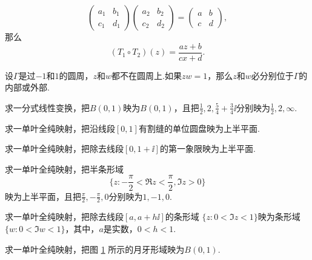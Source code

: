 \begin{xiti}
    \[\begin{pmatrix}
      a_1&b_1\\c_1&d_1
    \end{pmatrix}\begin{pmatrix}
    a_2&b_2\\c_2&d_2
    \end{pmatrix}=\begin{pmatrix}
    a&b\\c&d
    \end{pmatrix},\]
那么
\[(T_1\circ T_2)(z)=\frac{az+b}{cx+d}.\]
\item 设$\Gamma$是过$-1$和$1$的圆周，$z$和$w$都不在圆周上.如果$zw=1$，那么$z$和$w$必分别位于$\Gamma$的内部或外部.
\item 求一分式线性变换，把$B(0,1)$映为$B(0,1)$，且把$\frac12,2,\frac54+\frac34\ii$分别映为$\frac12,2,\infty$.
\item 求一单叶全纯映射，把沿线段$[0,1]$有割缝的单位圆盘映为上半平面.
\item 求一单叶全纯映射，把除去线段$[0,1+\ii]$的第一象限映为上半平面.
\item 求一单叶全纯映射，把半条形域
\[\bigg\{z:-\frac\pi2<\Re z<\frac\pi2,\Im z>0\bigg\}\]
映为上半平面，且把$\frac\pi2,-\frac\pi2,0$分别映为$1,-1,0$.
\item 求一单叶全纯映射，把除去线段$[a,a+h\ii]$的条形域
$\{z:0<\Im z<1\}$映为条形域$\{w:0<\Im w<1\}$，其中，$a$是实数，$0<h<1$.
\item 求一单叶全纯映射，把图 \ref{fig2.15} 所示的月牙形域映为$B(0,1)$.
\begin{figure}[!ht]
\centering
\begin{minipage}[b]{0.48\linewidth}
\centering
{}
\caption{\label{fig2.15}}
\end{minipage}\hfill
\begin{minipage}[b]{0.48\linewidth}
\centering
{}
\end{minipage}
\end{figure}
\end{xiti}
